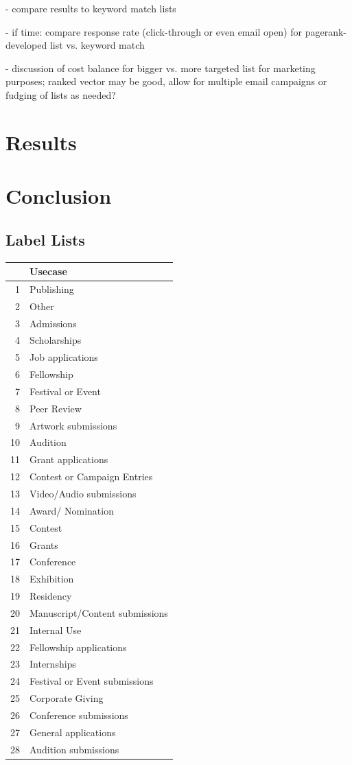 \documentclass[]{report}   %
\begin{document}
- compare results to keyword match lists

- if time: compare response rate (click-through or even email open) for pagerank-developed list vs. keyword match

- discussion of cost balance for bigger vs. more targeted list for marketing purposes; ranked vector may be good, allow for multiple email campaigns or fudging of lists as needed?

\chapter{Results}
\chapter{Conclusion}        

\appendix
\appendixpage
\addappheadtotoc
\section{Label Lists}
\label{app:labels}
\begin{minipage}{0.5\textwidth}
\centering
\begin{tabular}{rl}
  \hline
 & Usecase \\ 
  \hline
1 & Publishing \\ 
  2 & Other \\ 
  3 & Admissions \\ 
  4 & Scholarships \\ 
  5 & Job applications \\ 
  6 & Fellowship \\ 
  7 & Festival or Event \\ 
  8 & Peer Review \\ 
  9 & Artwork submissions \\ 
  10 & Audition \\ 
  11 & Grant applications \\ 
  12 & Contest or Campaign Entries \\ 
  13 & Video/Audio submissions \\ 
  14 & Award/ Nomination \\ 
  15 & Contest \\ 
  16 & Grants \\ 
  17 & Conference \\ 
  18 & Exhibition \\ 
  19 & Residency \\ 
  20 & Manuscript/Content submissions \\ 
  21 & Internal Use \\ 
  22 & Fellowship applications \\ 
  23 & Internships \\ 
  24 & Festival or Event submissions \\ 
  25 & Corporate Giving \\ 
  26 & Conference submissions \\ 
  27 & General applications \\ 
  28 & Audition submissions \\ 
   \hline
\end{tabular}
\end{minipage}
\newpage
\end{document}
